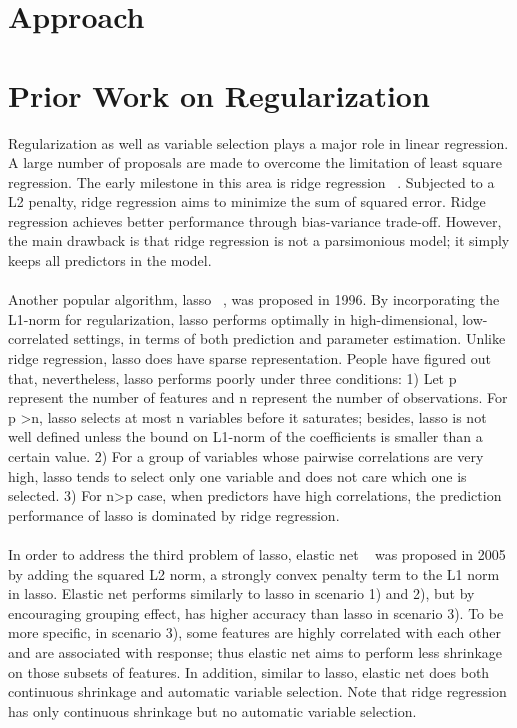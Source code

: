 \documentclass[11pt]{article}
\begin{document}
\section{Approach}

\section{Prior Work on Regularization}

Regularization as well as variable selection plays a major role in linear regression. A large number of proposals are made to overcome the limitation of least square regression. The early milestone in this area is ridge regression ~\cite{AEHoerl1970ridge}. Subjected to a L2 penalty, ridge regression aims to minimize the sum of squared error. Ridge regression achieves better performance through bias-variance trade-off. However, the main drawback is that ridge regression is not a parsimonious model; it simply keeps all predictors in the model. 
\\ \\
Another popular algorithm, lasso ~\cite{tibshirani1996regression}, was proposed in 1996. By incorporating the L1-norm for regularization, lasso performs optimally in high-dimensional, low-correlated settings, in terms of both prediction and parameter estimation. Unlike ridge regression, lasso does have sparse representation. People have figured out that, nevertheless, lasso performs poorly under three conditions: 1) Let p represent the number of features and n represent the number of observations. For p >n, lasso selects at most n variables before it saturates; besides, lasso is not well defined unless the bound on L1-norm of the coefficients is smaller than a certain value. 2) For a group of variables whose pairwise correlations are very high, lasso tends to select only one variable and does not care which one is selected. 3) For n>p case, when predictors have high correlations, the prediction performance of lasso is dominated by ridge regression.
\\ \\
In order to address the third problem of lasso, elastic net ~\cite{Zou2005Reg} was proposed in 2005 by adding the squared L2 norm, a strongly convex penalty term to the L1 norm in lasso. Elastic net performs similarly to lasso in scenario 1) and 2), but by encouraging grouping effect, has higher accuracy than lasso in scenario 3). To be more specific, in scenario 3), some features are highly correlated with each other and are associated with response; thus elastic net aims to perform less shrinkage on those subsets of features. In addition, similar to lasso, elastic net does both continuous shrinkage and automatic variable selection. Note that ridge regression has only continuous shrinkage but no automatic variable selection.
\end{document}

